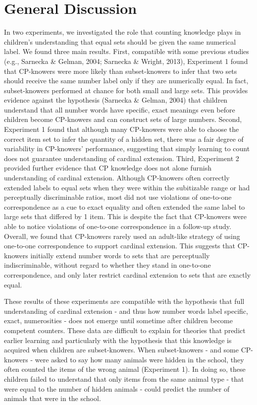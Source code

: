 \documentclass[
  man,floatsintext]{apa7}
\begin{document}
\section{General Discussion}\label{general-discussion}

In two experiments, we investigated the role that counting knowledge plays in children's understanding that equal sets should be given the same numerical label. We found three main results. First, compatible with some previous studies (e.g., Sarnecka \& Gelman, 2004; Sarnecka \& Wright, 2013), Experiment 1 found that CP-knowers were more likely than subset-knowers to infer that two sets should receive the same number label only if they are numerically equal. In fact, subset-knowers performed at chance for both small and large sets. This provides evidence against the hypothesis (Sarnecka \& Gelman, 2004) that children understand that all number words have specific, exact meanings even before children become CP-knowers and can construct sets of large numbers. Second, Experiment 1 found that although many CP-knowers were able to choose the correct item set to infer the quantity of a hidden set, there was a fair degree of variability in CP-knowers' performance, suggesting that simply learning to count does not guarantee understanding of cardinal extension. Third, Experiment 2 provided further evidence that CP knowledge does not alone furnish understanding of cardinal extension. Although CP-knowers often correctly extended labels to equal sets when they were within the subitizable range or had perceptually discriminable ratios, most did not use violations of one-to-one correspondence as a cue to exact equality and often extended the same label to large sets that differed by 1 item. This is despite the fact that CP-knowers were able to notice violations of one-to-one correspondence in a follow-up study. Overall, we found that CP-knowers rarely used an adult-like strategy of using one-to-one correspondence to support cardinal extension. This suggests that CP-knowers initially extend number words to sets that are perceptually indiscriminable, without regard to whether they stand in one-to-one correspondence, and only later restrict cardinal extension to sets that are exactly equal.

These results of these experiments are compatible with the hypothesis that full understanding of cardinal extension - and thus how number words label specific, exact, numerosities - does not emerge until sometime after children become competent counters. These data are difficult to explain for theories that predict earlier learning and particularly with the hypothesis that this knowledge is acquired when children are subset-knowers. When subset-knowers - and some CP-knowers - were asked to say how many animals were hidden in the school, they often counted the items of the wrong animal (Experiment 1). In doing so, these children failed to understand that only items from the same animal type - that were equal to the number of hidden animals - could predict the number of animals that were in the school.
\end{document}
